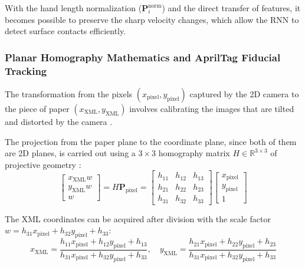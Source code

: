 With the hand length normalization ($\mathbf{P}_i^{\text{norm}}$) and the direct transfer of features, it becomes possible to preserve the sharp velocity changes, which allow the RNN to detect surface contacts efficiently.

\subsubsection{Planar Homography Mathematics and AprilTag Fiducial Tracking}
The transformation from the pixels $(x_{\text{pixel}}, y_{\text{pixel}})$ captured by the 2D camera to the piece of paper $(x_{\text{XML}}, y_{\text{XML}})$ involves calibrating the images that are tilted and distorted by the camera \cite{LonguetHiggins1985Machine, Pirchheim2011Homography, Wang2020Relative}.

The projection from the paper plane to the coordinate plane, since both of them are 2D planes, is carried out using a $3 \times 3$ homography matrix $H \in \mathbb{R}^{3 \times 3}$ of projective geometry \cite{LonguetHiggins1985Machine, Pirchheim2011Homography}:
\begin{equation}
\begin{bmatrix}
x_{\text{XML}} w \\
y_{\text{XML}} w \\
w
\end{bmatrix}
=
H \mathbf{P}_{\text{pixel}}
=
\begin{bmatrix}
h_{11} & h_{12} & h_{13} \\
h_{21} & h_{22} & h_{23} \\
h_{31} & h_{32} & h_{33}
\end{bmatrix}
\begin{bmatrix}
x_{\text{pixel}} \\
y_{\text{pixel}} \\
1
\end{bmatrix}
\label{eq:homography_equation_def}
\end{equation}

The XML coordinates can be acquired after division with the scale factor $w = h_{31} x_{\text{pixel}} + h_{32} y_{\text{pixel}} + h_{33}$:
\begin{equation}
x_{\text{XML}} = \frac{h_{11} x_{\text{pixel}} + h_{12} y_{\text{pixel}} + h_{13}}{h_{31} x_{\text{pixel}} + h_{32} y_{\text{pixel}} + h_{33}}, \quad
y_{\text{XML}} = \frac{h_{21} x_{\text{pixel}} + h_{22} y_{\text{pixel}} + h_{23}}{h_{31} x_{\text{pixel}} + h_{32} y_{\text{pixel}} + h_{33}}
\label{eq:homography_cartesian_def}
\end{equation}



